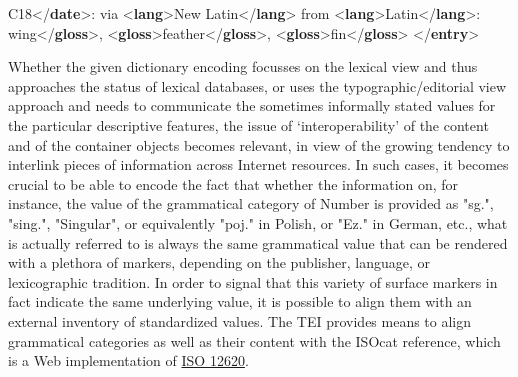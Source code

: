 \begin{shaded}
\hspace*{1em}C18{</\textbf{date}>}: via {<\textbf{lang}>}New Latin{</\textbf{lang}>} from {<\textbf{lang}>}Latin{</\textbf{lang}>}:\mbox{}\newline 
{}wing{</\textbf{gloss}>}, {<\textbf{gloss}>}feather{</\textbf{gloss}>}, {<\textbf{gloss}>}fin{</\textbf{gloss}>}\mbox{}\newline 
{}\mbox{}\newline 
{</\textbf{entry}>}\end{shaded}\egroup\par \par
Whether the given dictionary encoding focusses on the lexical view and thus approaches the status of lexical databases, or uses the typographic/editorial view approach and needs to communicate the sometimes informally stated values for the particular descriptive features, the issue of ‘interoperability’ of the content and of the container objects becomes relevant, in view of the growing tendency to interlink pieces of information across Internet resources. In such cases, it becomes crucial to be able to encode the fact that whether the information on, for instance, the value of the grammatical category of Number is provided as "sg.", "sing.", "Singular", or equivalently "poj." in Polish, or "Ez." in German, etc., what is actually referred to is always the same grammatical value that can be rendered with a plethora of markers, depending on the publisher, language, or lexicographic tradition. In order to signal that this variety of surface markers in fact indicate the same underlying value, it is possible to align them with an external inventory of standardized values. The TEI provides means to align grammatical categories as well as their content with the ISOcat reference, which is a Web implementation of \hyperref[ISO-12620]{ISO 12620}.\par

